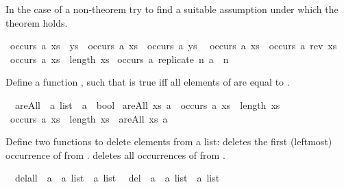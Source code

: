 \begin{isabellebody}
\begin{isamarkuptext}
In the case of a non-theorem try to find a suitable assumption under which the theorem holds.%
\end{isamarkuptext}%
\isamarkuptrue%
\ {\isachardoublequote}occurs\ a\ {\isacharparenleft}xs\ {\isacharat}\ ys{\isacharparenright}\ {\isacharequal}\ occurs\ a\ xs\ {\isacharplus}\ occurs\ a\ ys\ {\isachardoublequote}\isamarkupfalse%
\isanewline
\isamarkupfalse%
\ {\isachardoublequote}occurs\ a\ xs\ {\isacharequal}\ occurs\ a\ {\isacharparenleft}rev\ xs{\isacharparenright}{\isachardoublequote}\isamarkupfalse%
\isanewline
\isamarkupfalse%
\ {\isachardoublequote}occurs\ a\ xs\ {\isacharless}{\isacharequal}\ length\ xs{\isachardoublequote}\isamarkupfalse%
\isanewline
\isamarkupfalse%
\ {\isachardoublequote}occurs\ a\ {\isacharparenleft}replicate\ n\ a{\isacharparenright}\ {\isacharequal}\ n{\isachardoublequote}\isamarkupfalse%
\isamarkupfalse%
%
\begin{isamarkuptext}%
Define a function , such that  is true iff all elements of  are equal to .%
\end{isamarkuptext}%
\isamarkuptrue%
\ \ areAll\ {\isacharcolon}{\isacharcolon}\ {\isachardoublequote}{\isacharprime}a\ list\ {\isasymRightarrow}\ {\isacharprime}a\ {\isasymRightarrow}\ bool{\isachardoublequote}\isanewline
\isanewline
\isamarkupfalse%
\ {\isachardoublequote}areAll\ xs\ a\ {\isasymlongrightarrow}\ occurs\ a\ xs\ {\isacharequal}\ length\ xs{\isachardoublequote}\isamarkupfalse%
\isanewline
\isamarkupfalse%
\ {\isachardoublequote}occurs\ a\ xs\ {\isacharequal}\ length\ xs\ {\isasymlongrightarrow}\ areAll\ xs\ a{\isachardoublequote}\isamarkupfalse%
\isamarkupfalse%
%
\begin{isamarkuptext}%
Define two functions to delete elements from a list:
 deletes the first (leftmost) occurrence of  from .
 deletes all occurrences of  from .%
\end{isamarkuptext}%
\isamarkuptrue%
\ \ delall\ {\isacharcolon}{\isacharcolon}\ {\isachardoublequote}{\isacharprime}a\ {\isasymRightarrow}\ {\isacharprime}a\ list\ {\isasymRightarrow}\ {\isacharprime}a\ list{\isachardoublequote}\isanewline
\ \ del{}\ {\isacharcolon}{\isacharcolon}\ {\isachardoublequote}{\isacharprime}a\ {\isasymRightarrow}\ {\isacharprime}a\ list\ {\isasymRightarrow}\ {\isacharprime}a\ list{\isachardoublequote}\isanewline
\isanewline

\end{isabellebody}
